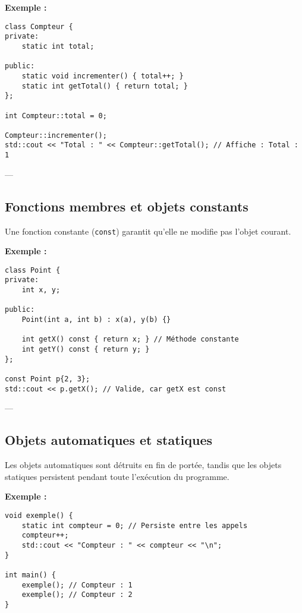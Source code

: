 \textbf{Exemple :}
\begin{tcolorbox}[colframe=blue!50!black, colback=blue!5!white, title=Exemple d'Attributs et Méthodes Statistiques, float=htb]
\begin{verbatim}
class Compteur {
private:
    static int total;

public:
    static void incrementer() { total++; }
    static int getTotal() { return total; }
};

int Compteur::total = 0;

Compteur::incrementer();
std::cout << "Total : " << Compteur::getTotal(); // Affiche : Total : 1
\end{verbatim}
\end{tcolorbox}
---

\subsection{ Fonctions membres et objets constants}
Une fonction constante (\texttt{const}) garantit qu’elle ne modifie pas l'objet courant.

\textbf{Exemple :}
\begin{tcolorbox}[colframe=blue!50!black, colback=blue!5!white, title=Exemple d'Attributs et Méthodes Statistiques, float=htb]
\begin{verbatim}
class Point {
private:
    int x, y;

public:
    Point(int a, int b) : x(a), y(b) {}

    int getX() const { return x; } // Méthode constante
    int getY() const { return y; }
};

const Point p{2, 3};
std::cout << p.getX(); // Valide, car getX est const
\end{verbatim}
\end{tcolorbox}
---

\subsection{ Objets automatiques et statiques}
Les objets automatiques sont détruits en fin de portée, tandis que les objets statiques persistent pendant toute l'exécution du programme.

\textbf{Exemple :}
\begin{tcolorbox}[colframe=blue!50!black, colback=blue!5!white, title=Exemple d'Attributs et Méthodes Statistiques, float=htb]
\begin{verbatim}
void exemple() {
    static int compteur = 0; // Persiste entre les appels
    compteur++;
    std::cout << "Compteur : " << compteur << "\n";
}

int main() {
    exemple(); // Compteur : 1
    exemple(); // Compteur : 2
}
\end{verbatim}
\end{tcolorbox}